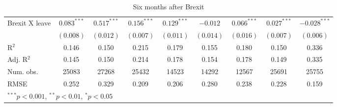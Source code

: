 \documentclass{article}
\begin{document}
\begin{table}
\begin{center}
{\begin{tabular}{l c c c c c c c c }
                                 Brexit X leave                   & $0.083^{***}$  & $0.517^{***}$  & $0.156^{***}$  & $0.129^{***}$  & $-0.012$       & $0.066^{***}$  & $0.027^{***}$  & $-0.028^{***}$ \\
                                 & $(0.008)$      & $(0.012)$      & $(0.007)$      & $(0.011)$      & $(0.014)$      & $(0.016)$      & $(0.007)$      & $(0.006)$      \\
\hline
R$^2$                            & 0.146          & 0.150          & 0.215          & 0.179          & 0.155          & 0.180          & 0.150          & 0.336          \\
Adj. R$^2$                       & 0.145          & 0.150          & 0.214          & 0.178          & 0.154          & 0.178          & 0.149          & 0.335          \\
Num. obs.                        & 25083          & 27268          & 25432          & 14523          & 14292          & 12567          & 25691          & 25755          \\
RMSE                             & 0.252          & 0.329          & 0.209          & 0.206          & 0.280          & 0.238          & 0.228          & 0.159          \\
\hline
\multicolumn{9}{l}{\scriptsize{$^{***}p<0.001$, $^{**}p<0.01$, $^*p<0.05$}}
\end{tabular}}
\caption{Six months after Brexit}
\label{table:coefficients}
\end{center}
\end{table}


\end{document}
